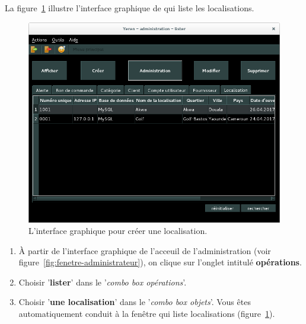 
\newpage
{}

La figure~\ref{fig:admin-localisations-lister} illustre
l'interface graphique de \yeren qui liste les localisations.\\

\begin{figure}[!htpb]
	\centering
	\includegraphics[scale=0.45]{images/localisation-lister.png}
	\caption{L'interface graphique pour cr\'eer une localisation.}
	\label{fig:admin-localisations-lister}
\end{figure}

\begin{enumerate}[1)]
	\item \`A partir de l'interface graphique de l'acceuil de
		l'administration (voir figure~\ref{fig:fenetre-administrateur}),
		on clique sur l'onglet intitul\'e \textbf{op\'erations}. 
		
	\item Choisir '\textbf{lister}' dans le '\emph{combo box
		op\'erations}'.
		
	\item Choisir '\textbf{une localisation}' dans le
		'\emph{combo box objets}'. Vous \^etes automatiquement
		conduit \`a la fen\^etre qui liste localisations
		(figure~\ref{fig:admin-localisations-lister}).
\end{enumerate}

